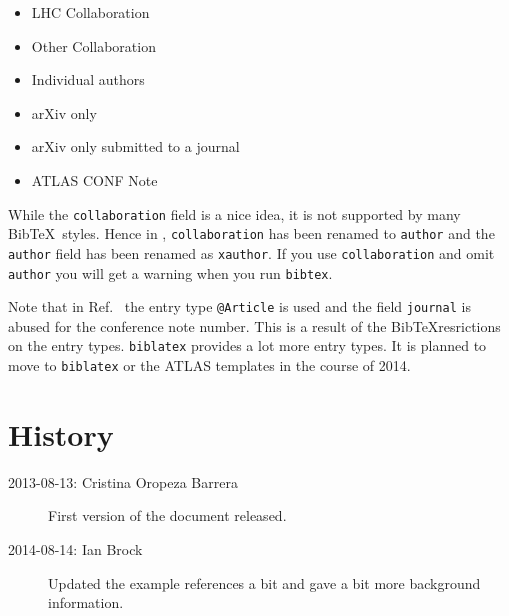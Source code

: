 \documentclass[UKenglish]{latex/atlasdoc}
\newcommand*{\BibTeX}{Bib\TeX}
\begin{document}
\begin{itemize}
	\item LHC Collaboration~\cite{lhcCollaboration:2012}
	\item Other Collaboration~\cite{otherCollaboration:2007}
	\item Individual authors~\cite{authors:2008}
	\item arXiv only~\cite{arxivOnly:2009}
	\item arXiv only submitted to a journal~\cite{arxivSub:2011}
	\item ATLAS CONF Note~\cite{atlasConf:2012} 
\end{itemize}

While the \texttt{collaboration} field is a nice idea, it is not supported by many \BibTeX\ styles.
Hence in \cite{lhcCollaboration:2012}, \texttt{collaboration} has been renamed to \texttt{author} and
the \texttt{author} field has been renamed as \texttt{xauthor}. If you use \texttt{collaboration} and omit
\texttt{author} you will get a warning when you run \texttt{bibtex}.

Note that in Ref.~\cite{atlasConf:2012} the entry type \texttt{@Article} is used and the field \texttt{journal} 
is abused for the conference note number. This is a result of the \BibTeX resrictions on the entry types.
\texttt{biblatex} provides a lot more entry types. It is planned to move to \texttt{biblatex} or the ATLAS templates
in the course of 2014.


\section*{History}

\begin{description}
  \item[2013-08-13: Cristina Oropeza Barrera] First version of the document released.
  \item[2014-08-14: Ian Brock] Updated the example references a bit and gave a bit more background information.
\end{description}

\printbibliography
% 
% 
\end{document}
